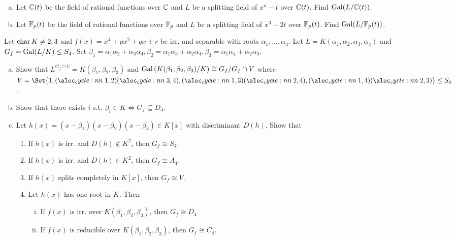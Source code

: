 \begin{exercise} \mbox{}
  \begin{enumerate}[(a)]
    \item Let $\mathbb{C}(t)$ be the field of rational functions over $\mathbb{C}$ and
      $L$ be a splitting field of $x^n - t$ over $\mathbb{C}(t)$.
      Find $\operatorname{Gal}(L / \mathbb{C}(t))$.
    \item Let $\mathbb{F}_p(t)$ be the field of rational functions over $\mathbb{F}_p$ and
      $L$ be a splitting field of $x^3 - 2t$ over $\mathbb{F}_p(t)$.
      Find $\operatorname{Gal}(L / \mathbb{F}_p(t))$.
  \end{enumerate}
\end{exercise}

\begin{exercise}
  Let $\operatorname{char} K \ne 2, 3$ and $f(x) = x^4 + px^2 + qx + r$ be irr. and separable
  with roots $\alpha_1, \dots, \alpha_4$. Let $L = K(\alpha_1, \alpha_2, \alpha_3, \alpha_4)$
  and $G_f = \operatorname{Gal}(L/K) \le S_4$. Set
  $\beta_1 = \alpha_1 \alpha_2 + \alpha_3 \alpha_4,
  \beta_2 = \alpha_1 \alpha_3 + \alpha_2 \alpha_4,
  \beta_3 = \alpha_1 \alpha_4 + \alpha_2 \alpha_3$.
  \begin{enumerate}[(a)]
    \item Show that $L^{G_f \cap V} = K(\beta_1, \beta_2, \beta_3)$ and
      $\operatorname{Gal}\left({K(\beta_1, \beta_2, \beta_3)}/{K}\right) \cong {G_f}/{G_f \cap V}$
      where $V = \Set{1, \cycle{1,2}\cycle{3,4}, \cycle{1,3}\cycle{2,4},
      \cycle{1,4}\cycle{2,3}} \le S_4$.
    \item Show that there exists $i$ s.t. $\beta_i \in K \iff G_f \subseteq D_4$.
    \item Let $h(x) = (x-\beta_1)(x-\beta_2)(x-\beta_3) \in K[x]$ with discriminant
      $D(h)$, Show that
      \begin{enumerate}[(1)]
        \item If $h(x)$ is irr. and $D(h) \not\in K^2$, then $G_f \cong S_4$.
        \item If $h(x)$ is irr. and $D(h) \in K^2$, then $G_f \cong A_4$.
        \item If $h(x)$ splits completely in $K[x]$, then $G_f \cong V$.
        \item Let $h(x)$ has one root in $K$. Then
          \begin{enumerate}[(i)]
            \item If $f(x)$ is irr. over $K(\beta_1, \beta_2, \beta_3)$, then
              $G_f \cong D_4$.
            \item If $f(x)$ is reducible over $K(\beta_1, \beta_2, \beta_3)$, then
              $G_f \cong C_4$.
          \end{enumerate}
      \end{enumerate}
  \end{enumerate}
\end{exercise}

